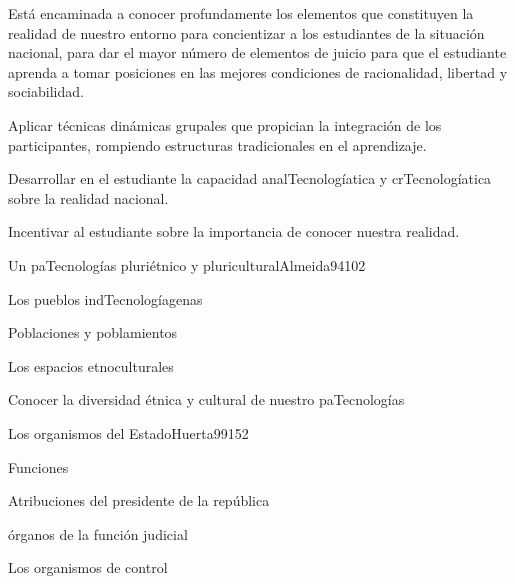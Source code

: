\begin{syllabus}


\begin{justification}
Está encaminada a conocer profundamente los elementos que constituyen la realidad de 
nuestro entorno para concientizar a los estudiantes de la situación nacional, 
para dar el mayor número de elementos de juicio para que el estudiante aprenda a tomar 
posiciones en las mejores condiciones de racionalidad, libertad y sociabilidad.
\end{justification}

\begin{goals}
\item Aplicar técnicas dinámicas grupales que propician la integración de los participantes, rompiendo estructuras tradicionales en el aprendizaje.
\item Desarrollar en el estudiante la capacidad analTecnologíatica y crTecnologíatica sobre la realidad nacional.
\item Incentivar al estudiante sobre la importancia de conocer nuestra realidad.
\end{goals}

\begin{outcomes}
\end{outcomes}

\begin{unit}{Un paTecnologías pluriétnico y pluricultural}{Almeida94}{10}{2}
   \begin{topics}
	\item Los pueblos indTecnologíagenas
	\item Poblaciones y poblamientos
	\item Los espacios etnoculturales
   \end{topics}

   \begin{unitgoals}
      \item Conocer la diversidad étnica y cultural de nuestro paTecnologías
   \end{unitgoals}
\end{unit}

\begin{unit}{Los organismos del Estado}{Huerta99}{15}{2}
   \begin{topics}
      \item Funciones
	\item Atribuciones del presidente de la república
	\item órganos de la función judicial
	\item Los organismos de control
  \end{topics}


\end{unit}
\end{syllabus}
